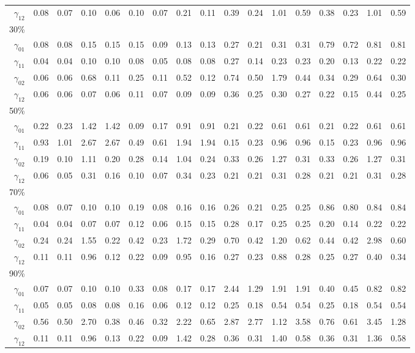 \documentclass[12pt]{article}
\begin{document}
\begin{table}
\begin{tabular}{r|rrrr|rrrr|rrrr|rrrr}
$\gamma_{12}$ & 0.08 & 0.07 & 0.10 & 0.06 & 0.10 & 0.07 & 0.21 & 0.11 & 0.39 & 0.24 & 1.01 & 0.59 & 0.38 & 0.23 & 1.01 & 0.59 \\
30\% &&&&&&&&&&&&&&&\\
$\gamma_{01}$ & 0.08 & 0.08 & 0.15 & 0.15 & 0.15 & 0.09 & 0.13 & 0.13 & 0.27 & 0.21 & 0.31 & 0.31 & 0.79 & 0.72 & 0.81 & 0.81 \\
$\gamma_{11}$ & 0.04 & 0.04 & 0.10 & 0.10 & 0.08 & 0.05 & 0.08 & 0.08 & 0.27 & 0.14 & 0.23 & 0.23 & 0.20 & 0.13 & 0.22 & 0.22 \\
$\gamma_{02}$ & 0.06 & 0.06 & 0.68 & 0.11 & 0.25 & 0.11 & 0.52 & 0.12 & 0.74 & 0.50 & 1.79 & 0.44 & 0.34 & 0.29 & 0.64 & 0.30 \\
$\gamma_{12}$ & 0.06 & 0.06 & 0.07 & 0.06 & 0.11 & 0.07 & 0.09 & 0.09 & 0.36 & 0.25 & 0.30 & 0.27 & 0.22 & 0.15 & 0.44 & 0.25 \\
50\% &&&&&&&&&&&&&&&\\
$\gamma_{01}$ & 0.22 & 0.23 & 1.42 & 1.42 & 0.09 & 0.17 & 0.91 & 0.91 & 0.21 & 0.22 & 0.61 & 0.61 & 0.21 & 0.22 & 0.61 & 0.61 \\
$\gamma_{11}$  & 0.93 & 1.01 & 2.67 & 2.67 & 0.49 & 0.61 & 1.94 & 1.94 & 0.15 & 0.23 & 0.96 & 0.96 & 0.15 & 0.23 & 0.96 & 0.96 \\
$\gamma_{02}$  & 0.19 & 0.10 & 1.11 & 0.20 & 0.28 & 0.14 & 1.04 & 0.24 & 0.33 & 0.26 & 1.27 & 0.31 & 0.33 & 0.26 & 1.27 & 0.31 \\
$\gamma_{12}$  & 0.06 & 0.05 & 0.31 & 0.16 & 0.10 & 0.07 & 0.34 & 0.23 & 0.21 & 0.21 & 0.31 & 0.28 & 0.21 & 0.21 & 0.31 & 0.28 \\
70\% &&&&&&&&&&&&&&&\\
$\gamma_{01}$  & 0.08 & 0.07 & 0.10 & 0.10 & 0.19 & 0.08 & 0.16 & 0.16 & 0.26 & 0.21 & 0.25 & 0.25 & 0.86 & 0.80 & 0.84 & 0.84 \\
$\gamma_{11}$  & 0.04 & 0.04 & 0.07 & 0.07 & 0.12 & 0.06 & 0.15 & 0.15 & 0.28 & 0.17 & 0.25 & 0.25 & 0.20 & 0.14 & 0.22 & 0.22 \\
$\gamma_{02}$  & 0.24 & 0.24 & 1.55 & 0.22 & 0.42 & 0.23 & 1.72 & 0.29 & 0.70 & 0.42 & 1.20 & 0.62 & 0.44 & 0.42 & 2.98 & 0.60 \\
$\gamma_{12}$  & 0.11 & 0.11 & 0.96 & 0.12 & 0.22 & 0.09 & 0.95 & 0.16 & 0.27 & 0.23 & 0.88 & 0.28 & 0.25 & 0.27 & 0.40 & 0.34 \\
90\% &&&&&&&&&&&&&&&\\
$\gamma_{01}$  & 0.07 & 0.07 & 0.10 & 0.10 & 0.33 & 0.08 & 0.17 & 0.17 & 2.44 & 1.29 & 1.91 & 1.91 & 0.40 & 0.45 & 0.82 & 0.82 \\
$\gamma_{11}$  & 0.05 & 0.05 & 0.08 & 0.08 & 0.16 & 0.06 & 0.12 & 0.12 & 0.25 & 0.18 & 0.54 & 0.54 & 0.25 & 0.18 & 0.54 & 0.54 \\
$\gamma_{02}$  & 0.56 & 0.50 & 2.70 & 0.38 & 0.46 & 0.32 & 2.22 & 0.65 & 2.87 & 2.77 & 1.12 & 3.58 & 0.76 & 0.61 & 3.45 & 1.28 \\
$\gamma_{12}$  & 0.11 & 0.11 & 0.96 & 0.13 & 0.22 & 0.09 & 1.42 & 0.28 & 0.36 & 0.31 & 1.40 & 0.58 & 0.36 & 0.31 & 1.36 & 0.58 \\
\hline
  \end{tabular}

\end{table}
\end{document}
